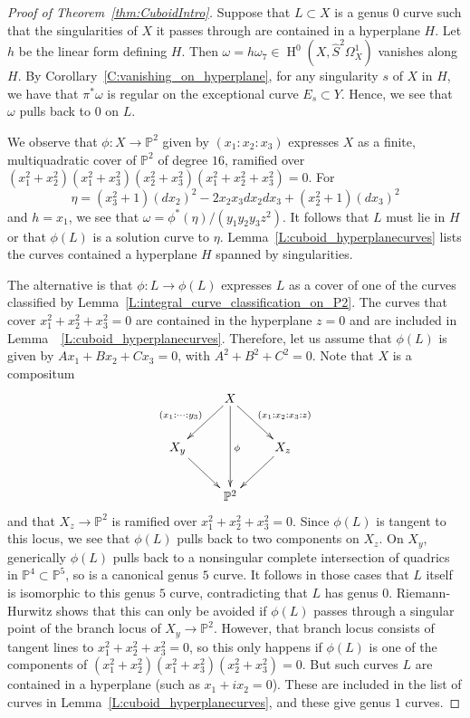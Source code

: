 \documentclass[12pt, reqno]{amsart}
\theoremstyle{definition}
\newcommand{\PP}{{\mathbb P}}
\DeclareMathOperator{\HH}{H}
\numberwithin{equation}{section}
\numberwithin{table}{section}
\begin{document}
\begin{proof}[Proof of Theorem~\ref{thm:CuboidIntro}]
Suppose that $L\subset X$ is a genus $0$ curve such that the singularities of $X$ it passes through are contained in a hyperplane $H$.
Let $h$ be the linear form defining $H$. Then $\omega=h\omega_7\in \HH^0(X,\hat{S}^2\Omega^1_X)$ vanishes along $H$. 
By Corollary~\ref{C:vanishing_on_hyperplane}, for any singularity $s$ of $X$ in $H$, we have that $\pi^*\omega$ is regular on the exceptional curve $E_s\subset Y$. Hence, we see that $\omega$ pulls back to $0$ on $L$.

We observe that $\phi\colon X\to\PP^2$ given by $(x_1:x_2:x_3)$ expresses $X$ as a finite, multiquadratic cover of $\PP^2$ of degree $16$, ramified over $(x_1^2+x_2^2)(x_1^2+x_3^2)(x_2^2+x_3^2)(x_1^2+x_2^2+x_3^2)=0$. For
\[\eta=(x_3^2+1)(dx_2)^2-2x_2x_3dx_2dx_3+(x_2^2+1)(dx_3)^2\]
and $h=x_1$, we see that $\omega=\phi^*(\eta)/(y_1y_2y_3z^2)$. It follows that $L$ must lie in $H$ or that $\phi(L)$ is a solution curve to $\eta$.
Lemma~\ref{L:cuboid_hyperplanecurves} lists the curves contained a hyperplane $H$ spanned by singularities.

The alternative is that $\phi\colon L\to\phi(L)$ expresses $L$ as a cover of one of the curves classified by Lemma~\ref{L:integral_curve_classification_on_P2}. The curves that cover $x_1^2+x_2^2+x_3^2=0$ are contained in the hyperplane $z=0$ and are included in Lemma~~\ref{L:cuboid_hyperplanecurves}. Therefore, let us assume that $\phi(L)$ is given by $Ax_1+Bx_2+Cx_3=0$, with $A^2+B^2+C^2=0$. Note that $X$ is a compositum
\[\xymatrix{
&X\ar[dr]^{(x_1:x_2:x_3:z)}\ar[dl]_{(x_1:\cdots:y_3)}\ar[dd]^\phi\\
X_y\ar[dr]&&X_z\ar[dl]\\
&\PP^2
}\]
and that $X_z\to\PP^2$ is ramified over $x_1^2+x_2^2+x_3^2=0$. Since $\phi(L)$ is tangent to this locus, we see that $\phi(L)$ pulls back to two components on $X_z$. 
On $X_y$, generically $\phi(L)$ pulls back to a nonsingular complete intersection of quadrics in $\PP^4\subset\PP^5$, so is a canonical genus $5$ curve. It follows in those cases that $L$ itself is isomorphic to this genus $5$ curve, contradicting that $L$ has genus $0$. Riemann-Hurwitz shows that this can only be avoided if $\phi(L)$ passes through a singular point of the branch locus of $X_y\to \PP^2$. However, that branch locus consists of tangent lines to $x_1^2+x_2^2+x_3^2=0$, so this only happens if $\phi(L)$ is one of the components of $(x_1^2+x_2^2)(x_1^2+x_3^2)(x_2^2+x_3^2)=0$. But such curves $L$ are contained in a hyperplane (such as $x_1+ix_2=0$). These are included in the list of curves in Lemma~\ref{L:cuboid_hyperplanecurves}, and these give genus $1$ curves.


\end{proof}
\end{document}

